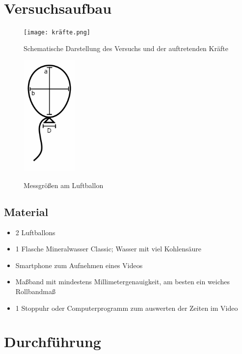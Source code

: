 \documentclass{article}
\begin{document}
    \section{Versuchsaufbau}
        \begin{figure}[h]
            \centering
            \begin{minipage}[t]{0.4\textwidth}\label{fig:versuch_schematik}
                \texttt{[image: kräfte.png]}
                \caption{Schematische Darstellung des Versuchs und der auftretenden Kräfte}
            \end{minipage}
            \hfill
            \begin{minipage}[t]{0.4\textwidth}\label{fig:abmessungen}
                \includegraphics[height=6cm]{luftballons.png}
                \caption{Messgrößen am Luftballon}
            \end{minipage}
        \end{figure} %

        \subsection{Material}
        \begin{itemize}
            \item 2 Luftballons
            \item 1 Flasche Mineralwasser Classic; Wasser mit viel Kohlensäure
            \item Smartphone zum Aufnehmen eines Videos
            \item Maßband mit mindestens Millimetergenauigkeit, am besten ein weiches Rollbandmaß
            \item 1 Stoppuhr oder Computerprogramm zum auswerten der Zeiten im Video
        \end{itemize}

    \section{Durchführung}
\end{document}
